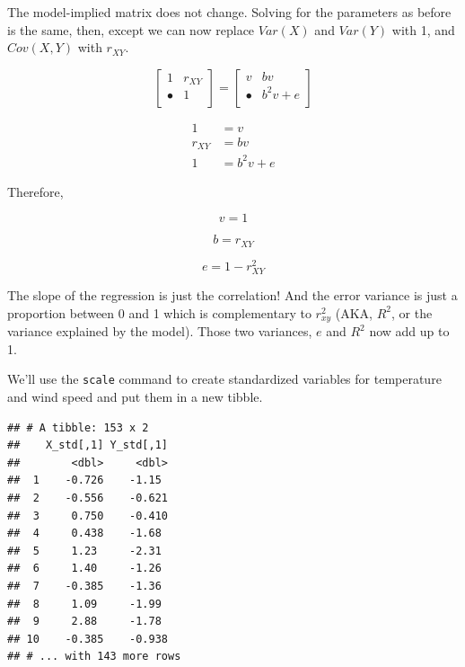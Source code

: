 \documentclass[
]{book}
\newenvironment{Shaded}{\begin{snugshade}}{\end{snugshade}}
\newcommand{\FunctionTok}[1]{\textcolor[rgb]{0.00,0.00,0.00}{#1}}
\newcommand{\NormalTok}[1]{#1}
\newcommand{\OtherTok}[1]{\textcolor[rgb]{0.56,0.35,0.01}{#1}}
\newcommand{\SpecialCharTok}[1]{\textcolor[rgb]{0.00,0.00,0.00}{#1}}
\begin{document}
The model-implied matrix does not change. Solving for the parameters as before is the same, then, except we can now replace \(Var(X)\) and \(Var(Y)\) with 1, and \(Cov(X, Y)\) with \(r_{XY}\).

\[
\begin{bmatrix}
1       &    r_{XY}  \\
\bullet      &    1  \\
\end{bmatrix} =
\begin{bmatrix}
v         &    bv         \\
\bullet   &    b^{2}v + e \\
\end{bmatrix}
\]

\begin{align}
1 &= v \\
r_{XY} &= bv \\
1 &= b^2v + e
\end{align}

Therefore,

\[
v = 1
\]

\[
b = r_{XY}
\]

\[
e = 1 - r_{XY}^{2}
\]

The slope of the regression is just the correlation! And the error variance is just a proportion between 0 and 1 which is complementary to \(r_{xy}^{2}\) (AKA, \(R^{2}\), or the variance explained by the model). Those two variances, \(e\) and \(R^{2}\) now add up to 1.

We'll use the \texttt{scale} command to create standardized variables for temperature and wind speed and put them in a new tibble.

\begin{Shaded}
\end{Shaded}

\begin{verbatim}
## # A tibble: 153 x 2
##    X_std[,1] Y_std[,1]
##        <dbl>     <dbl>
##  1    -0.726    -1.15 
##  2    -0.556    -0.621
##  3     0.750    -0.410
##  4     0.438    -1.68 
##  5     1.23     -2.31 
##  6     1.40     -1.26 
##  7    -0.385    -1.36 
##  8     1.09     -1.99 
##  9     2.88     -1.78 
## 10    -0.385    -0.938
## # ... with 143 more rows
\end{verbatim}
\end{document}
